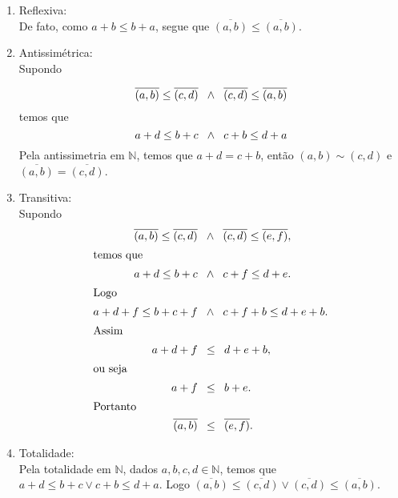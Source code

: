 \documentclass[../main.tex]{subfiles}
\begin{document}
\begin{dem}
    \begin{enumerate}[label=(\roman*)]
        \item Reflexiva: \\
            De fato, como $a+b \leq b+a$, segue que $\overline{(a,b)} \leq \overline{(a,b)}$.
        
        \item Antissimétrica: \\
            Supondo
            
            \[ \overline{(a,b)} \leq \overline{(c,d)} \hspace{8pt} {\land} \hspace{8pt} \overline{(c,d)} \leq \overline{(a,b)} \]
            temos que 
            \[ a+d \leq b+c \hspace{8pt} {\land} \hspace{8pt} c+b \leq d+a \]
            Pela antissimetria em $\mathbb{N}$, temos que $a+d = c+b$, então $(a,b) \sim (c,d)$ e $\overline{(a,b)} = \overline{(c,d)} $.
        
        \item Transitiva: \\
            Supondo
            \begin{align*}
                \overline{(a,b)} \leq \overline{(c,d)} & \hspace{8pt} {\land} \hspace{8pt} \overline{(c,d)} \leq \overline{(e,f)},  \\ \shortintertext{temos que}
                a+d \leq b+c & \hspace{8pt} {\land} \hspace{8pt} c+f \leq d+e.  \\ \shortintertext{Logo}
                a+d+f \leq b + c + f & \hspace{8pt} {\land} \hspace{8pt} c + f + b \leq d + e + b.  \\ \shortintertext{Assim}
                a + d + f & \hspace{8pt} {\leq} \hspace{8pt} d + e + b, \\ \shortintertext{ou seja}
                a + f & \hspace{8pt} {\leq} \hspace{8pt} b + e. \\ \shortintertext{Portanto}
                \overline{(a,b)}  & \hspace{8pt} {\leq} \hspace{8pt} \overline{(e,f)}.
            \end{align*}
            
        \item Totalidade: \\
        Pela totalidade em $\mathbb{N}$, dados $a,b,c,d \in \mathbb{N}$, temos que $a+d \leq b+c \lor c+b \leq d+a$. Logo 
        $\overline{(a,b)} \leq \overline{(c,d)} \lor  \overline{(c,d)} \leq  \overline{(a,b)}$.
        

\end{enumerate}
\end{dem}
\end{document}
